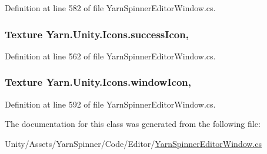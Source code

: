 Definition at line 582 of file Yarn\-Spinner\-Editor\-Window.\-cs.

\hypertarget{a00111_aec8aea03eb6e31771ebc98e0611fff79}{
\subsubsection[{success\-Icon}]{\setlength{\rightskip}{0pt plus 5cm}Texture Yarn.\-Unity.\-Icons.\-success\-Icon\hspace{0.3cm}{\ttfamily [static]}, {\ttfamily [get]}}}\label{a00111_aec8aea03eb6e31771ebc98e0611fff79}


Definition at line 562 of file Yarn\-Spinner\-Editor\-Window.\-cs.

\hypertarget{a00111_aa78ab016ad041bc36850c8b20ba63972}{
\subsubsection[{window\-Icon}]{\setlength{\rightskip}{0pt plus 5cm}Texture Yarn.\-Unity.\-Icons.\-window\-Icon\hspace{0.3cm}{\ttfamily [static]}, {\ttfamily [get]}}}\label{a00111_aa78ab016ad041bc36850c8b20ba63972}


Definition at line 592 of file Yarn\-Spinner\-Editor\-Window.\-cs.



The documentation for this class was generated from the following file\-:\begin{DoxyCompactItemize}
\item 
Unity/\-Assets/\-Yarn\-Spinner/\-Code/\-Editor/\hyperlink{a00293}{Yarn\-Spinner\-Editor\-Window.\-cs}\end{DoxyCompactItemize}
